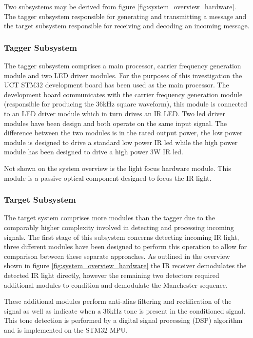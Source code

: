 Two subsystems may be derived from figure \ref{fig:system_overview_hardware}. The tagger subsystem responsible for generating and transmitting a message and the target subsystem responsible for receiving and decoding an incoming message.

\subsubsection{Tagger Subsystem}
The tagger subsystem comprises a main processor, carrier frequency generation module and two LED driver modules. For the purposes of this investigation the UCT STM32\footnotemark{} development board has been used as the main processor. The development board communicates with the carrier frequency generation module (responsible for producing the 36kHz square waveform), this module is connected to an LED driver module which in turn drives an IR LED. Two led driver modules have been design and both operate on the same input signal. The difference between the two modules is in the rated output power, the low power module is designed to drive a standard low power IR led while the high power module has been designed to drive a high power 3W IR led.

Not shown on the system overview is the light focus hardware module. This module is a passive optical component designed to focus the IR light.


\subsubsection{Target Subsystem}
The target system comprises more modules than the tagger due to the comparably higher complexity involved in detecting and processing incoming signals. The first stage of this subsystem concerns detecting incoming IR light, three different modules have been designed to perform this operation to allow for comparison between these separate approaches. As outlined in the overview shown in figure \ref{fig:system_overview_hardware} the IR receiver demodulates the detected IR light directly, however the remaining two detectors required additional modules to condition and demodulate the Manchester sequence.

These additional modules perform anti-alias filtering and rectification of the signal as well as indicate when a 36kHz tone is present in the conditioned signal. This tone detection is performed by a digital signal processing (DSP) algorithm and is implemented on the STM32 MPU.

